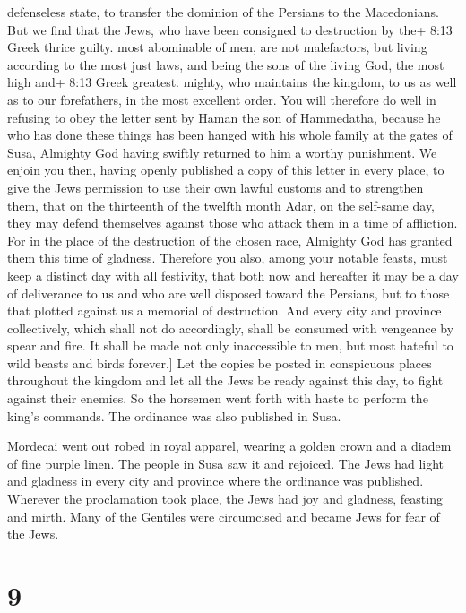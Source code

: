 \begin{itemize}
  defenseless state, to transfer the dominion of the Persians to the
  Macedonians. But we find that the Jews, who have been consigned to
  destruction by the+ 8:13 Greek thrice guilty. most abominable of men,
  are not malefactors, but living according to the most just laws, and
  being the sons of the living God, the most high and+ 8:13 Greek
  greatest. mighty, who maintains the kingdom, to us as well as to our
  forefathers, in the most excellent order. You will therefore do well
  in refusing to obey the letter sent by Haman the son of Hammedatha,
  because he who has done these things has been hanged with his whole
  family at the gates of Susa, Almighty God having swiftly returned to
  him a worthy punishment. We enjoin you then, having openly published a
  copy of this letter in every place, to give the Jews permission to use
  their own lawful customs and to strengthen them, that on the
  thirteenth of the twelfth month Adar, on the self-same day, they may
  defend themselves against those who attack them in a time of
  affliction. For in the place of the destruction of the chosen race,
  Almighty God has granted them this time of gladness. Therefore you
  also, among your notable feasts, must keep a distinct day with all
  festivity, that both now and hereafter it may be a day of deliverance
  to us and who are well disposed toward the Persians, but to those that
  plotted against us a memorial of destruction. And every city and
  province collectively, which shall not do accordingly, shall be
  consumed with vengeance by spear and fire. It shall be made not only
  inaccessible to men, but most hateful to wild beasts and birds
  forever.{]} Let the copies be posted in conspicuous places throughout
  the kingdom and let all the Jews be ready against this day, to fight
  against their enemies.  So the horsemen went forth with
  haste to perform the king's commands. The ordinance was also published
  in Susa.
\end{itemize}

 Mordecai went out robed in royal apparel, wearing a golden
crown and a diadem of fine purple linen. The people in Susa saw it and
rejoiced.  The Jews had light and gladness  in
every city and province where the ordinance was published. Wherever the
proclamation took place, the Jews had joy and gladness, feasting and
mirth. Many of the Gentiles were circumcised and became Jews for fear of
the Jews.

\hypertarget{section-8}{%
\section{9}\label{section-8}}


